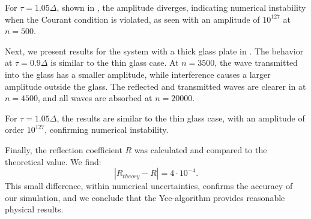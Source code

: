 \documentclass[11pt, A4paper]{article}
\begin{document}
For $\tau = 1.05 \Delta$, shown in , the amplitude diverges, indicating numerical instability when the Courant condition is violated, as seen with an amplitude of $10^{127}$ at $n=500$.

Next, we present results for the system with a thick glass plate in . The behavior at $\tau = 0.9 \Delta$ is similar to the thin glass case. At $n=3500$, the wave transmitted into the glass has a smaller amplitude, while interference causes a larger amplitude outside the glass. The reflected and transmitted waves are clearer in  at $n=4500$, and all waves are absorbed at $n=20000$.

For $\tau = 1.05 \Delta$, the results are similar to the thin glass case, with an amplitude of order $10^{127}$, confirming numerical instability.

Finally, the reflection coefficient $R$ was calculated and compared to the theoretical value. We find:
\[
    |R_{theory} - R| = 4 \cdot 10^{-4}.
\]
This small difference, within numerical uncertainties, confirms the accuracy of our simulation, and we conclude that the Yee-algorithm provides reasonable physical results.
\clearpage
\end{document}
